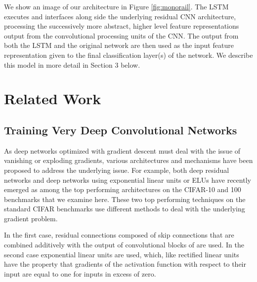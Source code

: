 \documentclass{article}
\begin{document}
We show an image of our architecture in Figure \ref{fig:monorail}. The LSTM executes and interfaces along side the underlying residual CNN architecture, processing the successively more abstract, higher level feature representations output from the convolutional processing units of the CNN. The output from both the LSTM and the original network are then used as the input feature representation given to the final classification layer(s) of the network. We describe this model in more detail in Section 3 below. 




\section{Related Work}

\subsection{Training Very Deep Convolutional Networks} %

As deep networks optimized with gradient descent must deal with the issue of vanishing or exploding gradients, various architectures and mechanisms have been proposed to address the underlying issue. For example, both deep residual networks and deep networks using exponential linear units or ELUs have recently emerged as among the top performing architectures on the CIFAR-10 and 100 benchmarks that we examine here. These two top performing techniques on the standard CIFAR benchmarks use different methods to deal with the underlying gradient problem. 

In the first case, residual connections composed of skip connections that are combined additively with the output of convolutional blocks of are used. In the second case exponential linear units are used, which, like rectified linear units have the property that gradients of the activation function with respect to their input are equal to one for inputs in excess of zero. 
\end{document}
